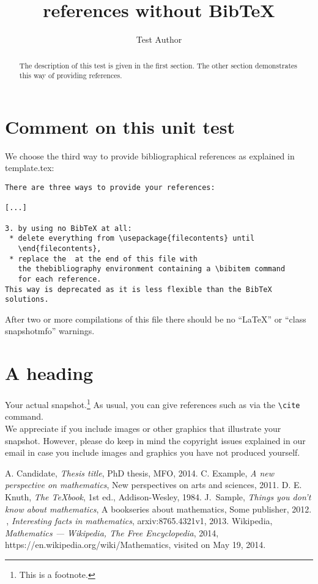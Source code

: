 \documentclass{snapshotmfo}
\author{Test Author}
\title{references without BibTeX}
\begin{document}
\begin{abstract}
The description of this test is given in the first section. The other section demonstrates this way of providing references.
\end{abstract}

\section{Comment on this unit test}
We choose the third way to provide bibliographical references as explained in template.tex:
\begin{verbatim}
There are three ways to provide your references:

[...]

3. by using no BibTeX at all:
 * delete everything from \usepackage{filecontents} until
   \end{filecontents}, 
 * replace the  at the end of this file with
   the thebibliography environment containing a \bibitem command
   for each reference.
This way is deprecated as it is less flexible than the BibTeX
solutions.
\end{verbatim}

After two or more compilations of this file there should be no ``LaTeX'' or ``class snapshotmfo'' warnings.

\section{A heading}
Your actual snapshot.\footnote{This is a footnote.} As usual, you can give references such as \cite{knuth1984texbook, wikiMath, sample13, sample12, sample11, sample14} via the \verb+\cite+ command.\\

We appreciate if you include images or other graphics that illustrate your snapshot. However, please do keep in mind the copyright issues explained in our email in case you include images and graphics you have not produced yourself.

\begin{thebibliography}{}
A. Candidate, {\slshape Thesis title}, PhD thesis, MFO, 2014.
C. Example, {\slshape A new perspective on mathematics}, New perspectives on arts and sciences, 2011.
D. E. Knuth, {\slshape The TeXbook}, 1st ed., Addison-Wesley, 1984.
J.\ Sample, {\slshape Things you don't know about mathematics}, A bookseries about mathematics, Some publisher, 2012.
\underline{\hphantom{J.\ Sam}}\,, {\slshape Interesting facts in mathematics}, arxiv:8765.4321v1, 2013.
Wikipedia, {\slshape Mathematics --- {W}ikipedia{,} The Free Encyclopedia}, 2014, https://en.wikipedia.org/wiki/Mathematics, visited on May 19, 2014.
\end{thebibliography}
\end{document}
